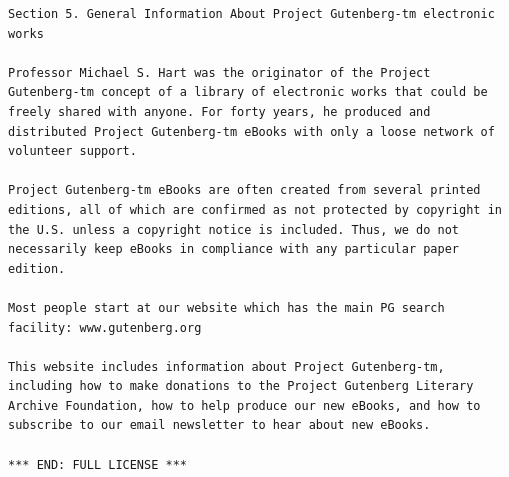\documentclass[11pt,oneside]{book}
\begin{document}
\begin{verbatim}
Section 5. General Information About Project Gutenberg-tm electronic works

Professor Michael S. Hart was the originator of the Project
Gutenberg-tm concept of a library of electronic works that could be
freely shared with anyone. For forty years, he produced and
distributed Project Gutenberg-tm eBooks with only a loose network of
volunteer support.

Project Gutenberg-tm eBooks are often created from several printed
editions, all of which are confirmed as not protected by copyright in
the U.S. unless a copyright notice is included. Thus, we do not
necessarily keep eBooks in compliance with any particular paper
edition.

Most people start at our website which has the main PG search
facility: www.gutenberg.org

This website includes information about Project Gutenberg-tm,
including how to make donations to the Project Gutenberg Literary
Archive Foundation, how to help produce our new eBooks, and how to
subscribe to our email newsletter to hear about new eBooks.

*** END: FULL LICENSE ***

\end{verbatim}
\end{document}
